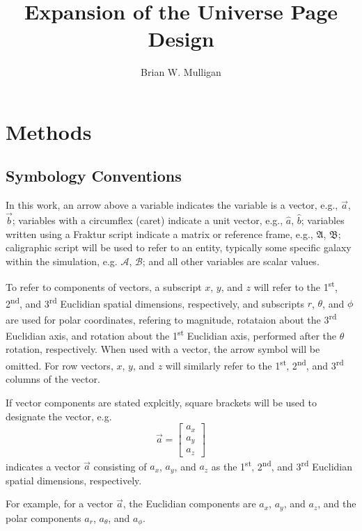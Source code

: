 \documentclass{article}
\title{Expansion of the Universe Page Design}
\author{Brian W. Mulligan}
\date{}
\begin{document}
\maketitle
\thispagestyle{fancy}
\section{Methods}
\subsection{Symbology Conventions}
In this work, an arrow above a variable indicates the variable is a vector, e.g., $\vec{a}$, $\vec{b}$; variables with a circumflex (caret) indicate a unit vector, e.g., $\hat{a}$, $\hat{b}$; variables written using a Fraktur script indicate a matrix or reference frame, e.g., $\mathfrak{A}$, $\mathfrak{B}$; caligraphic script will be used to refer to an entity, typically some specific galaxy within the simulation, e.g. $\mathcal{A}$, $\mathcal{B}$; and all other variables are scalar values.

To refer to components of vectors, a subscript $x$, $y$, and $z$ will refer to the 1\textsuperscript{st}, 2\textsuperscript{nd}, and 3\textsuperscript{rd} Euclidian spatial dimensions, respectively, and subscripts $r$, $\theta$, and $\phi$ are used for polar coordinates, refering to magnitude, rotataion about the 3\textsuperscript{rd} Euclidian axis, and rotation about the 1\textsuperscript{st} Euclidian axis, performed after the $\theta$ rotation, respectively. When used with a vector, the arrow symbol will be omitted. For row vectors, $x$, $y$, and $z$ will similarly refer to the 1\textsuperscript{st}, 2\textsuperscript{nd}, and 3\textsuperscript{rd} columns of the vector.


If vector components are stated explcitly, square brackets will be used to designate the vector, e.g.
\begin{equation*} \vec{a} = \begin{bmatrix} a_x \\ a_y \\ a_z \end{bmatrix} \end{equation*}
indicates a vector $\vec{a}$ consisting of $a_x$, $a_y$, and $a_z$ as the 1\textsuperscript{st}, 2\textsuperscript{nd}, and 3\textsuperscript{rd} Euclidian spatial dimensions, respectively.

For example, for a vector $\vec{a}$, the Euclidian components are $a_x$, $a_y$, and $a_z$, and the polar components $a_r$, $a_\theta$, and $a_\phi$.
\end{document}
